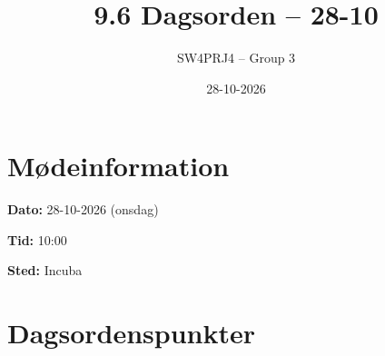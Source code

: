\documentclass[a4paper,11pt]{article}
\title{9.6 Dagsorden -- 28-10}
\author{SW4PRJ4 -- Group 3}
\date{28-10-2026}
\begin{document}
\maketitle

\section*{Mødeinformation}

\textbf{Dato:} 28-10-2026 (onsdag)

\textbf{Tid:} 10:00

\textbf{Sted:} Incuba

\section*{Dagsordenspunkter}
\end{document}
